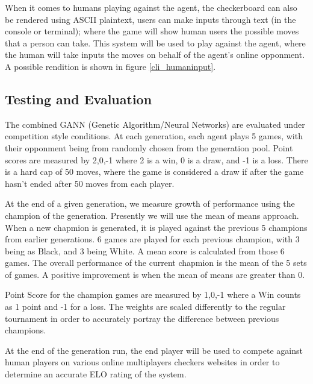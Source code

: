 \documentclass[12pt,a4paper]{article}
\begin{document}
    When it comes to humans playing against the agent, the checkerboard can also be rendered using ASCII plaintext, users can make inputs through text (in the console or terminal); where the game will show human users the possible moves that a person can take. This system will be used to play against the agent, where the human will take inputs the moves on behalf of the agent's online opponment. A possible rendition is shown in figure \ref{cli_humaninput}.

\subsection*{Testing and Evaluation}
    The combined GANN (Genetic Algorithm/Neural Networks) are evaluated under competition style conditions. At each generation, each agent plays 5 games, with their opponment being from randomly chosen from the generation pool. Point scores are measured by {2,0,-1} where 2 is a win, 0 is a draw, and -1 is a loss. There is a hard cap of 50 moves, where the game is considered a draw if after the game hasn't ended after 50 moves from each player.

    At the end of a given generation, we measure growth of performance using the champion of the generation. Presently we will use the mean of means approach. When a new chapmion is generated, it is played against the previous 5 champions from earlier generations. 6 games are played for each previous champion, with 3 being as Black, and 3 being White. A mean score is calculated from those 6 games. The overall performance of the current chapmion is the mean of the 5 sets of games. A positive improvement is when the mean of means are greater than 0. 

    Point Score for the champion games are measured by {1,0,-1} where a Win counts as 1 point and -1 for a loss. The weights are scaled differently to the regular tournament in order to accurately portray the difference between previous champions.

    At the end of the generation run, the end player will be used to compete against human players on various online multiplayers checkers websites in order to determine an accurate ELO rating of the system.



\end{document}
